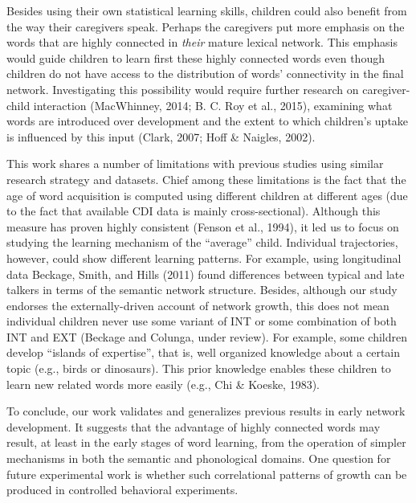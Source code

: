 \documentclass[english,floatsintext,man]{apa6}
\theoremstyle{definition}
\theoremstyle{definition}
\theoremstyle{definition}
\theoremstyle{remark}
\begin{document}
Besides using their own statistical learning skills, children could also
benefit from the way their caregivers speak. Perhaps the caregivers put
more emphasis on the words that are highly connected in \emph{their}
mature lexical network. This emphasis would guide children to learn
first these highly connected words even though children do not have
access to the distribution of words' connectivity in the final network.
Investigating this possibility would require further research on
caregiver-child interaction (MacWhinney, 2014; B. C. Roy et al., 2015),
examining what words are introduced over development and the extent to
which children's uptake is influenced by this input (Clark, 2007; Hoff
\& Naigles, 2002).

This work shares a number of limitations with previous studies using
similar research strategy and datasets. Chief among these limitations is
the fact that the age of word acquisition is computed using different
children at different ages (due to the fact that available CDI data is
mainly cross-sectional). Although this measure has proven highly
consistent (Fenson et al., 1994), it led us to focus on studying the
learning mechanism of the \enquote{average} child. Individual
trajectories, however, could show different learning patterns. For
example, using longitudinal data Beckage, Smith, and Hills (2011) found
differences between typical and late talkers in terms of the semantic
network structure. Besides, although our study endorses the
externally-driven account of network growth, this does not mean
individual children never use some variant of INT or some combination of
both INT and EXT (Beckage and Colunga, under review). For example, some
children develop \enquote{islands of expertise}, that is, well organized
knowledge about a certain topic (e.g., birds or dinosaurs). This prior
knowledge enables these children to learn new related words more easily
(e.g., Chi \& Koeske, 1983).

To conclude, our work validates and generalizes previous results in
early network development. It suggests that the advantage of highly
connected words may result, at least in the early stages of word
learning, from the operation of simpler mechanisms in both the semantic
and phonological domains. One question for future experimental work is
whether such correlational patterns of growth can be produced in
controlled behavioral experiments.

\vspace{1em}

\vspace{1em}
\end{document}
